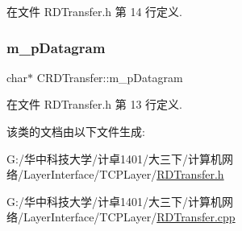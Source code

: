 在文件 R\+D\+Transfer.\+h 第 14 行定义.

\mbox{\label{class_c_r_d_transfer_a0ea73d394ba8b738de5d151b22425be6}} 
\subsubsection{\texorpdfstring{m\+\_\+p\+Datagram}{m\_pDatagram}}
{\footnotesize\ttfamily char$\ast$ C\+R\+D\+Transfer\+::m\+\_\+p\+Datagram}



在文件 R\+D\+Transfer.\+h 第 13 行定义.



该类的文档由以下文件生成\+:\begin{DoxyCompactItemize}
\item 
G\+:/华中科技大学/计卓1401/大三下/计算机网络/\+Layer\+Interface/\+T\+C\+P\+Layer/\hyperlink{_r_d_transfer_8h}{R\+D\+Transfer.\+h}\item 
G\+:/华中科技大学/计卓1401/大三下/计算机网络/\+Layer\+Interface/\+T\+C\+P\+Layer/\hyperlink{_r_d_transfer_8cpp}{R\+D\+Transfer.\+cpp}\end{DoxyCompactItemize}
